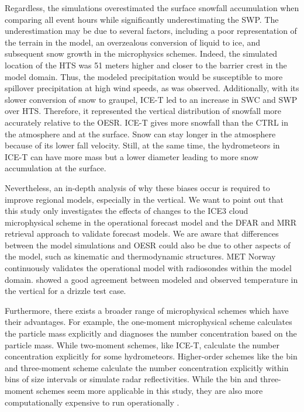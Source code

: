 \documentclass{ametsocV5}
\begin{document}
		Regardless, the simulations overestimated the surface snowfall accumulation when comparing all event hours while significantly underestimating the SWP. The underestimation may be due to several factors, including a poor representation of the terrain in the model, an overzealous conversion of liquid to ice, and subsequent snow growth in the microphysics schemes. Indeed, the simulated location of the HTS was 51 meters higher and closer to the barrier crest in the model domain. Thus, the modeled precipitation would be susceptible to more spillover precipitation at high wind speeds, as was observed. Additionally, with its slower conversion of snow to graupel, ICE-T led to an increase in SWC and SWP over HTS. Therefore, it represented the vertical distribution of snowfall more accurately relative to the OESR. ICE-T gives more snowfall than the CTRL in the atmosphere and at the surface. Snow can stay longer in the atmosphere because of its lower fall velocity. Still, at the same time, the hydrometeors in ICE-T can have more mass but a lower diameter leading to more snow accumulation at the surface.  

		Nevertheless, an in-depth analysis of why these biases occur is required to improve regional models, especially in the vertical. We want to point out that this study only investigates the effects of changes to the ICE3 cloud microphysical scheme in the operational forecast model and the DFAR and MRR retrieval approach to validate forecast models. We are aware that differences between the model simulations and OESR could also be due to other aspects of the model, such as kinematic and thermodynamic structures. MET Norway continuously validates the operational model with radiosondes within the model domain. \citet{engdahl_effects_2020} showed a good agreement between modeled and observed temperature in the vertical for a drizzle test case. 
		
		Furthermore, there exists a broader range of microphysical schemes which have their advantages. For example, the one-moment microphysical scheme calculates the particle mass explicitly and diagnoses the number concentration based on the particle mass. While two-moment schemes, like ICE-T, calculate the number concentration explicitly for some hydrometeors. Higher-order schemes like the bin and three-moment scheme calculate the number concentration explicitly within bins of size intervals or simulate radar reflectivities. While the bin and three-moment schemes seem more applicable in this study, they are also more computationally expensive to run operationally \citep{morrison_impact_2009}. 
\end{document}
